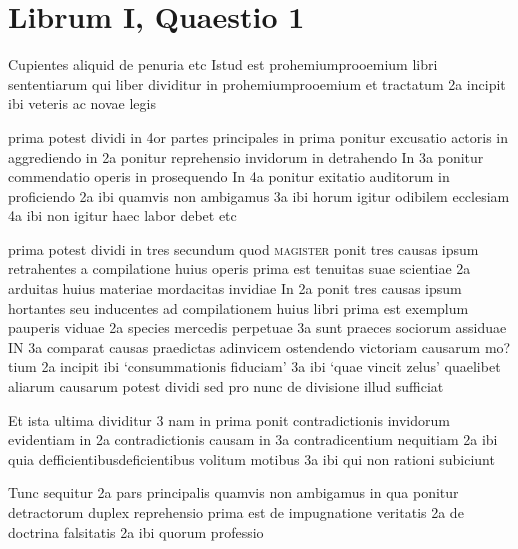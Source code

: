 \documentclass[twoside, openright]{article}
\newcommand{\name}[1]{\textsc{#1}}
\begin{document}
        \chapter*{Librum I, Quaestio 1}
        
         
        \beginnumbering
         
        \pstart
        Cupientes aliquid de penuria etc Istud est prohemiumprooemium libri sententiarum qui liber dividitur in prohemiumprooemium et tractatum 2a incipit ibi veteris ac novae legis
        \pend
     
        \pstart
        prima potest dividi in 4or partes principales  in prima ponitur excusatio actoris in aggrediendo  in 2a ponitur reprehensio invidorum in detrahendo In 3a ponitur commendatio operis in prosequendo  In 4a ponitur exitatio auditorum in proficiendo 2a ibi quamvis non ambigamus 3a ibi horum igitur odibilem ecclesiam 4a ibi non igitur haec labor debet etc
        \pend
     
        \pstart
        prima potest dividi in tres secundum quod \name{magister} ponit tres causas ipsum retrahentes a compilatione huius operis prima est tenuitas suae scientiae 2a arduitas huius materiae mordacitas invidiae In 2a ponit tres causas ipsum hortantes seu inducentes ad compilationem huius libri  prima est exemplum pauperis viduae 2a species mercedis perpetuae  3a sunt praeces sociorum assiduae  IN 3a comparat causas praedictas adinvicem ostendendo victoriam causarum mo?tium 2a incipit ibi \enquote*{consummationis fiduciam} 3a ibi \enquote*{quae vincit zelus}  quaelibet aliarum causarum potest dividi sed pro nunc de divisione illud sufficiat
        \pend
     
        \pstart
        Et ista ultima dividitur 3  nam in prima ponit contradictionis invidorum evidentiam in 2a contradictionis causam  in 3a contradicentium nequitiam 2a ibi quia defficientibusdeficientibus volitum motibus 3a ibi qui non rationi subiciunt
        \pend
     
        \pstart
        Tunc sequitur 2a pars principalis quamvis non ambigamus in qua ponitur detractorum duplex reprehensio prima est de impugnatione veritatis 2a de doctrina falsitatis 2a ibi quorum professio
        \pend
     
\end{document}
